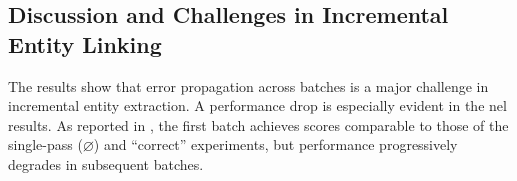\subsection{Discussion and Challenges in Incremental Entity Linking}








\label{sec:ijckg:discussion}

The results show that error propagation across batches is a major challenge in incremental entity extraction. A performance drop is especially evident in the \ac{nel} results. As reported in , the first batch achieves scores comparable to those of the single-pass ($\varnothing$) and ``correct'' experiments, but performance progressively degrades in subsequent batches.

